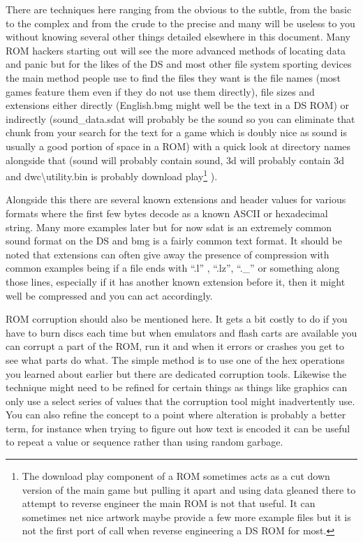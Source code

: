 \documentclass[
]{book}
\begin{document}
There are techniques here ranging from the obvious to the subtle, from the basic to the complex and from the crude to the precise and many will be useless to you without knowing several other things detailed elsewhere in this document. Many ROM hackers starting out will see the more advanced methods of locating data and panic but for the likes of the DS and most other file system sporting devices the main method people use to find the files they want is the file names (most games feature them even if they do not use them directly), file sizes and extensions either directly (English.bmg might well be the text in a DS ROM) or indirectly (sound\_data.sdat will probably be the sound so you can eliminate that chunk from your search for the text for a game which is doubly nice as sound is usually a good portion of space in a ROM) with a quick look at directory names alongside that (sound will probably contain sound, 3d will probably contain 3d and dwc\textbackslash utility.bin is probably download play\footnote{The download play component of a ROM sometimes acts as a cut down version of the main game but pulling it apart and using data gleaned there to attempt to reverse engineer the main ROM is not that useful. It can sometimes net nice artwork maybe provide a few more example files but it is not the first port of call when reverse engineering a DS ROM for most.} ).

Alongside this there are several known extensions and header values for various formats where the first few bytes decode as a known ASCII or hexadecimal string. Many more examples later but for now sdat is an extremely common sound format on the DS and bmg is a fairly common text format. It should be noted that extensions can often give away the presence of compression with common examples being if a file ends with ``.l'' , ``.lz'', ``.\_'' or something along those lines, especially if it has another known extension before it, then it might well be compressed and you can act accordingly.

ROM corruption should also be mentioned here. It gets a bit costly to do if you have to burn discs each time but when emulators and flash carts are available you can corrupt a part of the ROM, run it and when it errors or crashes you get to see what parts do what. The simple method is to use one of the hex operations you learned about earlier but there are dedicated corruption tools. Likewise the technique might need to be refined for certain things as things like graphics can only use a select series of values that the corruption tool might inadvertently use. You can also refine the concept to a point where alteration is probably a better term, for instance when trying to figure out how text is encoded it can be useful to repeat a value or sequence rather than using random garbage.
\end{document}
